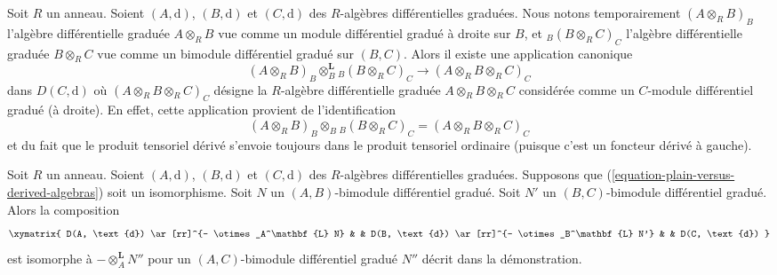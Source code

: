 \noindent
Soit $R$ un anneau. Soient $(A, \text{d})$, $(B, \text{d})$ et
$(C, \text{d})$ des $R$-algèbres différentielles graduées.
Nous notons temporairement $(A \otimes_R B)_B$ l'algèbre
différentielle graduée $A \otimes_R B$ vue comme un module différentiel gradué à
droite sur $B$, et ${}_B(B \otimes_R C)_C$ l'algèbre différentielle
graduée $B \otimes_R C$ vue comme un bimodule différentiel gradué sur
$(B, C)$. Alors il existe une application canonique
\begin{equation}
\label{equation-plain-versus-derived-algebras}
(A \otimes_R B)_B \otimes_B^\mathbf{L} {}_B(B \otimes_R C)_C
\longrightarrow
(A \otimes_R B \otimes_R C)_C
\end{equation}
dans $D(C, \text{d})$ où $(A \otimes_R B \otimes_R C)_C$
désigne la $R$-algèbre
différentielle graduée $A \otimes_R B \otimes_R C$ considérée comme un
$C$-module différentiel gradué (à droite). En effet, cette
application provient de l'identification
$$
(A \otimes_R B)_B \otimes_B {}_B(B \otimes_R C)_C =
(A \otimes_R B \otimes_R C)_C
$$
et du fait que le produit tensoriel dérivé s'envoie toujours dans le
produit tensoriel ordinaire (puisque c'est un foncteur dérivé à gauche).

\begin{lemma}
\label{lemma-compose-tensor-functors-general-algebra}
Soit $R$ un anneau. Soient $(A, \text{d})$, $(B, \text{d})$ et
$(C, \text{d})$ des $R$-algèbres différentielles graduées.
Supposons que (\ref{equation-plain-versus-derived-algebras}) soit un
isomorphisme. Soit $N$ un $(A, B)$-bimodule différentiel gradué.
Soit $N'$ un $(B, C)$-bimodule différentiel gradué.
Alors la composition
$$
\xymatrix{
D(A, \text{d}) \ar[rr]^{- \otimes_A^\mathbf{L} N} & &
D(B, \text{d}) \ar[rr]^{- \otimes_B^\mathbf{L} N'} & &
D(C, \text{d})
}
$$
est isomorphe à $- \otimes_A^\mathbf{L} N''$ pour un $(A, C)$-bimodule
différentiel gradué $N''$ décrit dans la démonstration.
\end{lemma}


